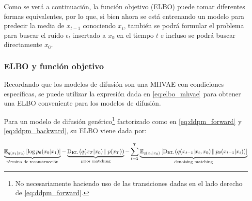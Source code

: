 Como se verá a continuación, la función objetivo (ELBO) puede tomar diferentes formas equivalentes, por lo que, si bien ahora se está entrenando un modelo para predecir la media de $x_{t-1}$ conociendo $x_t$, también se podrá formular el problema para buscar el ruido $\epsilon_t$ insertado a $x_0$ en el tiempo $t$ e incluso se podrá buscar directamente $x_0$.

\subsubsection{ELBO y función objetivo}

Recordando que los modelos de difusión son una MHVAE con condiciones específicas, se puede utilizar la expresión dada en \eqref{eq:elbo_mhvae} para obtener una ELBO conveniente para los modelos de difusión.

\begin{teo}
    \label{teo:elbo_ddpm}
    Para un modelo de difusión genérico\footnote{No necesariamente haciendo uso de las transiciones dadas en el lado derecho de \eqref{eq:ddpm_forward}.} factorizado como en \eqref{eq:ddpm_forward} y \eqref{eq:ddpm_backward}, su ELBO viene dada por:

    \begin{equation}
        \label{eq:elbo_ddpm}
        \underbrace{\mathbb{E}_{q(x_1|x_0)}\left[\log p_\theta(x_0|x_1)\right]}_{\text{término de reconstrucción}} - \underbrace{\operatorname{D_{KL}}\left(q(x_T|x_0)\,\|\,p(x_T)\right)}_{\text{prior matching}} - \sum_{t=2}^T \underbrace{\mathbb{E}_{q(x_t|x_0)}\left[\operatorname{D_{KL}}\left(q(x_{t-1}|x_t,x_0)\,\|\,p_\theta(x_{t-1}|x_t)\right)\right]}_{\text{denoising matching}}
    \end{equation}
\end{teo}

